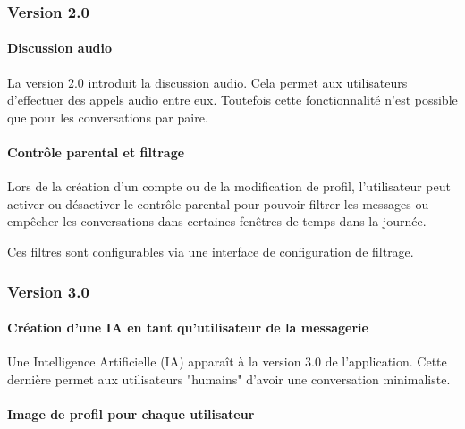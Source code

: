 \subsubsection{Version 2.0}

\paragraph{Discussion audio\newline}

\par La version 2.0 introduit la discussion audio. Cela permet aux utilisateurs d’effectuer des appels audio entre eux. Toutefois cette fonctionnalité n'est possible que pour les conversations par paire.

\paragraph{Contrôle parental et filtrage\newline}

\par Lors de la création d’un compte ou de la modification de profil, l’utilisateur peut activer ou désactiver le contrôle parental pour pouvoir filtrer les messages ou empêcher les conversations dans certaines fenêtres de temps dans la journée.

\par Ces filtres sont configurables via une interface de configuration de filtrage.

\subsubsection{Version 3.0}

\paragraph{Création d’une IA en tant qu’utilisateur de la messagerie\newline}

\par Une Intelligence Artificielle (IA) apparaît à la version 3.0 de l’application. Cette dernière permet aux utilisateurs "humains" d’avoir une conversation minimaliste.

\paragraph{Image de profil pour chaque utilisateur\newline}

